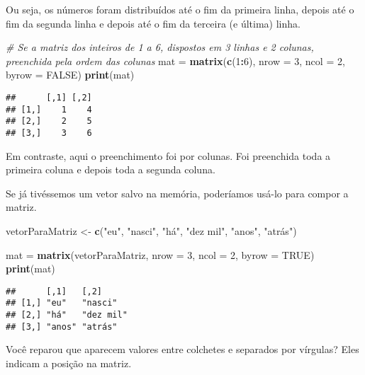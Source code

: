 \documentclass[
]{book}
\newenvironment{Shaded}{\begin{snugshade}}{\end{snugshade}}
\newcommand{\CommentTok}[1]{\textcolor[rgb]{0.56,0.35,0.01}{\textit{#1}}}
\newcommand{\DataTypeTok}[1]{\textcolor[rgb]{0.13,0.29,0.53}{#1}}
\newcommand{\DecValTok}[1]{\textcolor[rgb]{0.00,0.00,0.81}{#1}}
\newcommand{\KeywordTok}[1]{\textcolor[rgb]{0.13,0.29,0.53}{\textbf{#1}}}
\newcommand{\NormalTok}[1]{#1}
\newcommand{\OperatorTok}[1]{\textcolor[rgb]{0.81,0.36,0.00}{\textbf{#1}}}
\newcommand{\OtherTok}[1]{\textcolor[rgb]{0.56,0.35,0.01}{#1}}
\newcommand{\StringTok}[1]{\textcolor[rgb]{0.31,0.60,0.02}{#1}}
\begin{document}
Ou seja, os números foram distribuídos até o fim da primeira linha, depois até o fim da segunda linha e depois até o fim da terceira (e última) linha.

\begin{Shaded}
\begin{Highlighting}[]
\CommentTok{# Se a matriz dos inteiros de 1 a 6, dispostos em 3 linhas e 2 colunas, preenchida pela ordem das colunas}
\NormalTok{mat =}\StringTok{ }\KeywordTok{matrix}\NormalTok{(}\KeywordTok{c}\NormalTok{(}\DecValTok{1}\OperatorTok{:}\DecValTok{6}\NormalTok{), }\DataTypeTok{nrow =} \DecValTok{3}\NormalTok{, }\DataTypeTok{ncol =} \DecValTok{2}\NormalTok{, }\DataTypeTok{byrow =} \OtherTok{FALSE}\NormalTok{)}
\KeywordTok{print}\NormalTok{(mat)}
\end{Highlighting}
\end{Shaded}

\begin{verbatim}
##      [,1] [,2]
## [1,]    1    4
## [2,]    2    5
## [3,]    3    6
\end{verbatim}

Em contraste, aqui o preenchimento foi por colunas. Foi preenchida toda a primeira coluna e depois toda a segunda coluna.

Se já tivéssemos um vetor salvo na memória, poderíamos usá-lo para compor a matriz.

\begin{Shaded}
\begin{Highlighting}[]
\NormalTok{vetorParaMatriz <-}\StringTok{ }\KeywordTok{c}\NormalTok{(}\StringTok{"eu"}\NormalTok{, }\StringTok{"nasci"}\NormalTok{, }\StringTok{"há"}\NormalTok{, }\StringTok{"dez mil"}\NormalTok{, }\StringTok{"anos"}\NormalTok{, }\StringTok{"atrás"}\NormalTok{) }

\NormalTok{mat =}\StringTok{ }\KeywordTok{matrix}\NormalTok{(vetorParaMatriz, }\DataTypeTok{nrow =} \DecValTok{3}\NormalTok{, }\DataTypeTok{ncol =} \DecValTok{2}\NormalTok{, }\DataTypeTok{byrow =} \OtherTok{TRUE}\NormalTok{)}
\KeywordTok{print}\NormalTok{(mat)}
\end{Highlighting}
\end{Shaded}

\begin{verbatim}
##      [,1]   [,2]     
## [1,] "eu"   "nasci"  
## [2,] "há"   "dez mil"
## [3,] "anos" "atrás"
\end{verbatim}

Você reparou que aparecem valores entre colchetes e separados por vírgulas? Eles indicam a posição na matriz.
\end{document}
